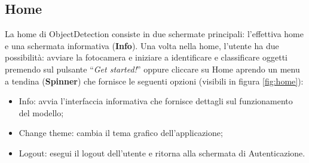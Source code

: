 \subsection{Home}
La home di ObjectDetection consiste in due schermate principali: l’effettiva home e una schermata informativa (\textbf{Info}).
Una volta nella home, l’utente ha due possibilità: avviare la fotocamera e iniziare a identificare e classificare oggetti premendo sul pulsante
“\textit{Get started!}” oppure cliccare su Home aprendo un menu a tendina (\textbf{Spinner}) che fornisce le seguenti opzioni (visibili in figura \ref{fig:home}):
\begin{itemize}
    \item Info: avvia l’interfaccia informativa che fornisce dettagli sul funzionamento del modello;
    \item Change theme: cambia il tema grafico dell’applicazione; 
    \item Logout: esegui il logout dell'utente e ritorna alla schermata di Autenticazione.
\end{itemize}
